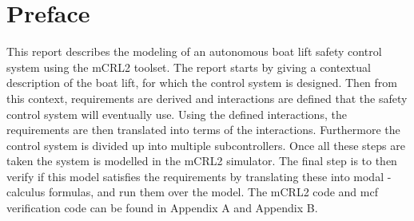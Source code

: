 \section{Preface}
This report describes the modeling of an autonomous boat lift safety control system using the mCRL2 toolset. The report starts by giving a contextual description of the boat lift, for which the control system is designed. Then from this context, requirements are derived and interactions are defined that the safety control system will eventually use. Using the defined interactions, the requirements are then translated into terms of the interactions. Furthermore the control system is divided up into multiple subcontrollers. Once all these steps are taken the system is modelled in the mCRL2 simulator. The final step is to then verify if this model satisfies the requirements by translating these into modal {\textmu}-calculus formulas, and run them over the model. The mCRL2 code and mcf verification code can be found in Appendix A and Appendix B.



